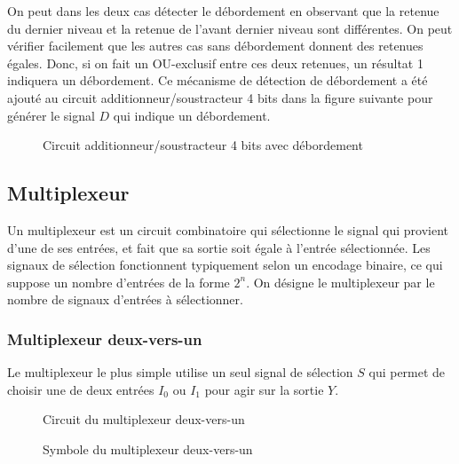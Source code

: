 \documentclass[11pt]{article}
\begin{document}
On peut dans les deux cas détecter le débordement en observant que la
retenue du dernier niveau et la retenue de l'avant dernier niveau sont
différentes. On peut vérifier facilement que les autres cas sans
débordement donnent des retenues égales. Donc, si on fait un
OU-exclusif entre ces deux retenues, un résultat 1 indiquera un
débordement. Ce mécanisme de détection de débordement a été ajouté au
circuit additionneur/soustracteur 4 bits dans la figure suivante pour
générer le signal \(D\) qui indique un débordement.

\begin{figure}[htbp]
\centering

\caption{\label{fig:org0b43d83}Circuit additionneur/soustracteur 4 bits avec débordement}
\end{figure}


\subsection{Multiplexeur}
\label{sec:org30ce68f}

Un multiplexeur est un circuit combinatoire qui sélectionne le signal
qui provient d'une de ses entrées, et fait que sa sortie soit égale à
l'entrée sélectionnée. Les signaux de sélection fonctionnent
typiquement selon un encodage binaire, ce qui suppose un nombre
d'entrées de la forme \(2^n\). On désigne le multiplexeur par le
nombre de signaux d'entrées à sélectionner.

\subsubsection{Multiplexeur deux-vers-un}
\label{sec:orgbc015c3}

Le multiplexeur le plus simple utilise un seul signal de sélection
\(S\) qui permet de choisir une de deux entrées \(I_0\) ou \(I_1\)
pour agir sur la sortie \(Y\).

\begin{figure}[htbp]
\centering

\caption{\label{fig:org147384a}Circuit du multiplexeur deux-vers-un}
\end{figure}

\begin{figure}[htbp]
\centering

\caption{\label{fig:org3261825}Symbole du multiplexeur deux-vers-un}
\end{figure}
\end{document}
